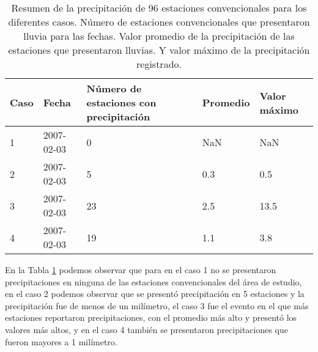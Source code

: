 \begin{itemize}
\begin{table}[H]
\caption{Resumen de la precipitación de 96 estaciones convencionales para los diferentes casos. Número de estaciones convencionales que presentaron lluvia para las fechas. Valor promedio de la precipitación de las estaciones que presentaron lluvias. Y valor máximo de la precipitación registrado.}
\label{tabla_lluvias}
\begin{tabular}{llp{4cm}ll}
Caso & Fecha & Número de estaciones con precipitación & Promedio & Valor máximo \\ \hline
	1 & 2007-02-03 & 0  & NaN & NaN \\
	2 & 2007-02-03 & 5  & 0.3 & 0.5 \\
	3 & 2007-02-03 & 23 & 2.5 & 13.5\\
	4 & 2007-02-03 & 19 & 1.1 & 3.8 \\

\end{tabular}
\end{table}

En la Tabla \ref{tabla_lluvias} podemos observar que para en el caso 1 no se presentaron precipitaciones en ninguna de las estaciones convencionales del área de estudio, en el caso 2 podemos observar que se presentó precipitación en 5 estaciones y la precipitación fue de menos de un milímetro, el caso 3 fue el evento en el que más estaciones reportaron precipitaciones, con el promedio más alto y presentó los valores más altos, y en el caso 4 también se presentaron precipitaciones que fueron mayores a 1 milímetro.






\end{itemize}
